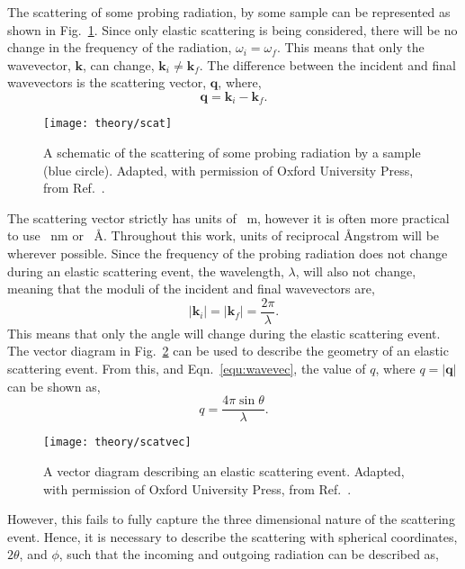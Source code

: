 The scattering of some probing radiation, by some sample can be represented as shown in Fig.~\ref{fig:scat}.
Since only elastic scattering is being considered, there will be no change in the frequency of the radiation, $\omega_i = \omega_f$.
This means that only the wavevector, $\mathbf{k}$, can change, $\mathbf{k}_i\neq \mathbf{k}_f$.
The difference between the incident and final wavevectors is the scattering vector, $\mathbf{q}$, where,
%
\begin{equation}
	\mathbf{q} = \mathbf{k}_i - \mathbf{k}_f.
\end{equation}
%
%
\begin{figure}
	\centering
	\texttt{[image: theory/scat]}
	\caption{A schematic of the scattering of some probing radiation by a sample (blue circle). Adapted, with permission of Oxford University Press\textsuperscript{\textcopyright}, from Ref.~\cite{Sivia2011}.}
	\label{fig:scat}
\end{figure}
%
The scattering vector strictly has units of \si{\per\meter}, however it is often more practical to use \si{\per\nano\meter} or \si{\per\angstrom}.
Throughout this work, units of reciprocal \AA ngstrom will be wherever possible.
Since the frequency of the probing radiation does not change during an elastic scattering event, the wavelength, $\lambda$, will also not change, meaning that the moduli of the incident and final wavevectors are,
%
\begin{equation}
	|\mathbf{k}_i| = |\mathbf{k}_f|=\frac{2\pi}{\lambda}.
	\label{equ:wavevec}
\end{equation}
%
This means that only the angle will change during the elastic scattering event.
The vector diagram in Fig.~\ref{fig:scatvec} can be used to describe the geometry of an elastic scattering event.
From this, and Eqn.~\ref{equ:wavevec}, the value of $q$, where $q = |\mathbf{q}|$ can be shown as,
%
\begin{equation}
	q = \frac{4\pi\sin{\theta}}{\lambda}.
	\label{equ:theq}
\end{equation}
%
%
\begin{figure}
	\centering
	\texttt{[image: theory/scatvec]}
	\caption{A vector diagram describing an elastic scattering event. Adapted, with permission of Oxford University Press\textsuperscript{\textcopyright}, from Ref.~\cite{Sivia2011}.}
	\label{fig:scatvec}
\end{figure}
%
However, this fails to fully capture the three dimensional nature of the scattering event.
Hence, it is necessary to describe the scattering with spherical coordinates, $2\theta$, and $\phi$, such that the incoming and outgoing radiation can be described as,
